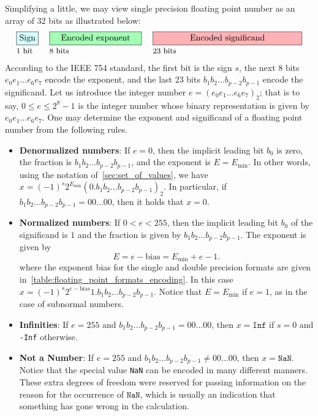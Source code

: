 Simplifying a little,
we may view single precision floating point number as an array of 32 bits as illustrated below:
\begin{alignat*}{3}
    &\fcolorbox{black}{lightcyan}{\text{Sign}}
    \hspace{.1cm}
    &&\fcolorbox{black}{lightgreen}{\quad\text{Encoded exponent}\quad}
    \hspace{.1cm}
    &&\fcolorbox{black}{lightred}{\qquad\qquad\text{Encoded significand}\qquad\qquad}\\[-.1cm]
    &\text{\small 1 bit} &&\text{\small 8 bits} &&\text{\small 23 bits}
\end{alignat*}
According to the IEEE 754 standard,
the first bit is the sign $s$,
the next 8 bits $e_0 e_1 \dots e_6 e_7$ encode the exponent,
and the last 23 bits $b_1 b_2 \dots b_{p-2} b_{p-1}$ encode the significand.
Let us introduce the integer number $e = (e_0 e_1 \dots e_6 e_7)_2$;
that is to say, $0 \leq e \leq 2^8 -1$ is the integer number whose binary representation
is given by $e_0 e_1 \dots e_6 e_7$.
One may determine the exponent and significand of a floating point number from the following rules.
\begin{itemize}
    \item
        \textbf{Denormalized numbers}:
        If $e = 0$, then the implicit leading bit $b_0$ is zero,
        the fraction is $b_1 b_2 \dots b_{p-2} b_{p-1}$, and the exponent is $E = E_{\min}$.
        In other words, using the notation of~\cref{sec:set_of_values},
        we have $x = (-1)^s 2^{E_{\min}} (0.b_1b_2 \dots b_{p-2} b_{p-1})_2$.
        In particular, if $b_1 b_2 \dots b_{p-2} b_{p-1} = 00\dots00$,
        then it holds that $x = 0$.
    \item
        \textbf{Normalized numbers}:
        If $0 < e < 255$,
        then the implicit leading bit $b_0$ of the significand is $1$
        and the fraction is given by $b_1 b_2 \dots b_{p-2} b_{p-1}$.
        The exponent is given by
        \[
            E = e - \mathrm{bias} = E_{\min} + e - 1.
        \]
        where the exponent bias for the single and double precision formats are given in~\cref{table:floating_point_formats_encoding}.
        In this case $x = (-1)^s 2^{e - \mathrm{bias}} 1.b_1b_2 \dots b_{p-2} b_{p-1}$.
        Notice that $E = E_{\min}$ if $e = 1$,
        as in the case of subnormal numbers.
    \item
        \textbf{Infinities}:
        If $e = 255$ and $b_1 b_2 \dots b_{p-2} b_{p-1} = 00\dots00$,
        then $x = \texttt{Inf}$ if $s = 0$ and \texttt{-Inf} otherwise.
    \item
        \textbf{Not a Number}:
        If $e = 255$ and  $b_1 b_2 \dots b_{p-2} b_{p-1} \neq 00\dots00$,
        then $x = \texttt{NaN}$.
        Notice that the special value \texttt{NaN} can be encoded in many different manners.
        These extra degrees of freedom were reserved for passing information on the reason for the occurrence of $\texttt{NaN}$,
        which is usually an indication that something has gone wrong in the calculation.
\end{itemize}

